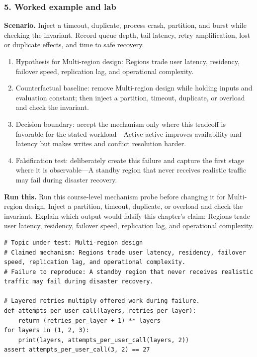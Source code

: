 \subsubsection*{5. Worked example and lab}
\textbf{Scenario.} Inject a timeout, duplicate, process crash, partition, and burst while checking the invariant. Record queue depth, tail latency, retry amplification, lost or duplicate effects, and time to safe recovery.
\begin{enumerate}
\item Hypothesis for Multi-region design: Regions trade user latency, residency, failover speed, replication lag, and operational complexity.
\item Counterfactual baseline: remove Multi-region design while holding inputs and evaluation constant; then inject a partition, timeout, duplicate, or overload and check the invariant.
\item Decision boundary: accept the mechanism only where this tradeoff is favorable for the stated workload—Active-active improves availability and latency but makes writes and conflict resolution harder.
\item Falsification test: deliberately create this failure and capture the first stage where it is observable—A standby region that never receives realistic traffic may fail during disaster recovery.
\end{enumerate}
\textbf{Run this.} Run this course-level mechanism probe before changing it for Multi-region design. Inject a partition, timeout, duplicate, or overload and check the invariant. Explain which output would falsify this chapter's claim: Regions trade user latency, residency, failover speed, replication lag, and operational complexity.
\begin{Verbatim}[fontsize=\scriptsize]
# Topic under test: Multi-region design
# Claimed mechanism: Regions trade user latency, residency, failover speed, replication lag, and operational complexity.
# Failure to reproduce: A standby region that never receives realistic traffic may fail during disaster recovery.

# Layered retries multiply offered work during failure.
def attempts_per_user_call(layers, retries_per_layer):
    return (retries_per_layer + 1) ** layers
for layers in (1, 2, 3):
    print(layers, attempts_per_user_call(layers, 2))
assert attempts_per_user_call(3, 2) == 27
\end{Verbatim}

